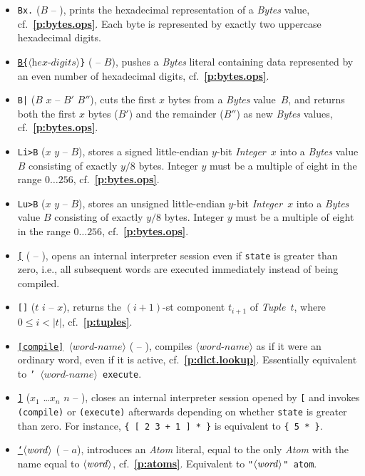 \documentclass[12pt,oneside]{article}
\def\refpoint#1{{\rm\textbf{\ref{#1}}}}
\let\ptref=\refpoint
\begin{document}
\begin{itemize}
\item {\tt Bx.} ($B$ -- ), prints the hexadecimal representation of a {\em Bytes\/} value, cf.~\ptref{p:bytes.ops}. Each byte is represented by exactly two uppercase hexadecimal digits.
\item {\tt \underline{B\{}$\langle{\textit{hex-digits}}\rangle$\}} ( -- $B$), pushes a {\em Bytes\/} literal containing data represented by an even number of hexadecimal digits, cf.~\ptref{p:bytes.ops}.
\item {\tt B|} ($B$ $x$ -- $B'$ $B''$), cuts the first $x$ bytes from a {\em Bytes\/} value~$B$, and returns both the first $x$ bytes ($B'$) and the remainder ($B''$) as new {\em Bytes\/} values, cf.~\ptref{p:bytes.ops}.
\item {\tt Li>B} ($x$ $y$ -- $B$), stores a signed little-endian $y$-bit {\em Integer\/}~$x$ into a {\em Bytes\/} value $B$ consisting of exactly $y/8$ bytes. Integer $y$ must be a multiple of eight in the range $0\ldots256$, cf.~\ptref{p:bytes.ops}.
\item {\tt Lu>B} ($x$ $y$ -- $B$), stores an unsigned little-endian $y$-bit {\em Integer\/}~$x$ into a {\em Bytes\/} value $B$ consisting of exactly $y/8$ bytes. Integer $y$ must be a multiple of eight in the range $0\ldots256$, cf.~\ptref{p:bytes.ops}.
\item {\tt \underline{[}} ( -- ), opens an internal interpreter session even if {\tt state} is greater than zero, i.e., all subsequent words are executed immediately instead of being compiled.
\item {\tt []} ($t$ $i$ -- $x$), returns the $(i+1)$-st component $t_{i+1}$ of {\em Tuple\/}~$t$, where $0\leq i<|t|$, cf.~\ptref{p:tuples}.
\item {\tt \underline{[compile]} $\langle\textit{word-name}\rangle$} ( -- ), compiles $\langle\textit{word-name}\rangle$ as if it were an ordinary word, even if it is active, cf.~\ptref{p:dict.lookup}. Essentially equivalent to {\tt ' $\langle\textit{word-name}\rangle$ execute}.
\item {\tt \underline{]}} ($x_1$ \dots $x_n$ $n$ -- ), closes an internal interpreter session opened by {\tt [} and invokes {\tt (compile)} or {\tt (execute)} afterwards depending on whether {\tt state} is greater than zero. For instance, {\tt \{ [ 2 3 + 1 ] * \}} is equivalent to {\tt \{ 5 * \}}.
\item {\tt \underline{`}$\langle\textit{word\/}\rangle$} ( -- $a$), introduces an {\em Atom\/} literal, equal to the only {\em Atom\/} with the name equal to $\langle\textit{word\/}\rangle$, cf.~\ptref{p:atoms}. Equivalent to {\tt "$\langle\textit{word\/}\rangle$" atom}. 

\end{itemize}
\end{document}
